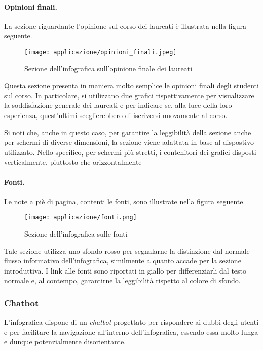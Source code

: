 \paragraph{Opinioni finali.} La sezione riguardante l'opinione sul corso dei laureati è illustrata nella figura seguente. 
\begin{figure}[H] 
    \centering 
    \texttt{[image: applicazione/opinioni\_finali.jpeg]} 
    \caption{Sezione dell'infografica sull'opinione finale dei laureati}
    \label{fig:opinioni_finali}
\end{figure}
Questa sezione presenta in maniera molto semplice le opinioni finali degli studenti sul corso. In particolare, si utilizzano due grafici rispettivamente per visualizzare la soddisfazione 
generale dei laureati e per indicare se, alla luce della loro esperienza, quest'ultimi sceglierebbero di iscriversi nuovamente al corso.

\bigskip
\noindent Si noti che, anche in questo caso, per garantire la leggibilità della sezione anche per schermi di diverse dimensioni, la sezione viene adattata 
in base al dispostivo utilizzato. Nello specifico, per schermi più stretti, i contenitori dei grafici disposti verticalmente, piuttosto che orizzontalmente

\paragraph{Fonti.} Le note a piè di pagina, contenti le fonti, sono illustrate nella figura seguente. 
\begin{figure}[H] 
    \centering 
    \texttt{[image: applicazione/fonti.png]} 
    \caption{Sezione dell'infografica sulle fonti}
    \label{fig:app_fonti}
\end{figure}
Tale sezione utilizza uno sfondo rosso per segnalarne la distinzione dal normale flusso informativo dell'infografica, similmente a quanto accade per la sezione introduttiva. 
I link alle fonti sono riportati in giallo per differenziarli dal testo normale e, al contempo, garantirne la leggibilità rispetto al colore di sfondo.

\subsubsection{Chatbot}\label{subsubsec:chatbot}
L'infografica dispone di un \emph{chatbot} progettato per rispondere ai dubbi degli utenti e per facilitare la navigazione all'interno dell'infografica, 
essendo essa molto lunga e dunque potenzialmente disorientante.


